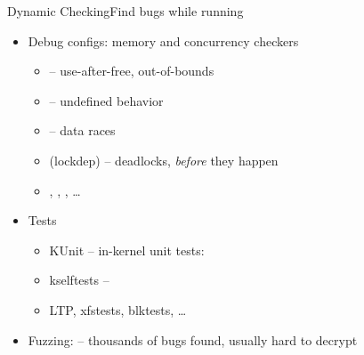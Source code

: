\begin{frame}{Dynamic Checking}{Find bugs while running}

  \begin{itemize}[<+->]
    \item Debug configs: memory and concurrency checkers
      \begin{itemize}[<.->]
	\item {} -- use-after-free, out-of-bounds
	\item {} -- undefined behavior
	\item {} -- data races
	\item {} (lockdep) -- deadlocks, \emph{before} they happen
	\item {}, , , \dots
      \end{itemize}
    \item Tests
      \begin{itemize}[<.->]
	\item KUnit -- in-kernel unit tests: 
	\item kselftests -- 
	\item LTP, xfstests, blktests, \dots
      \end{itemize}
    \item Fuzzing:  -- thousands of bugs found, usually hard to decrypt
  \end{itemize}

\end{frame}

